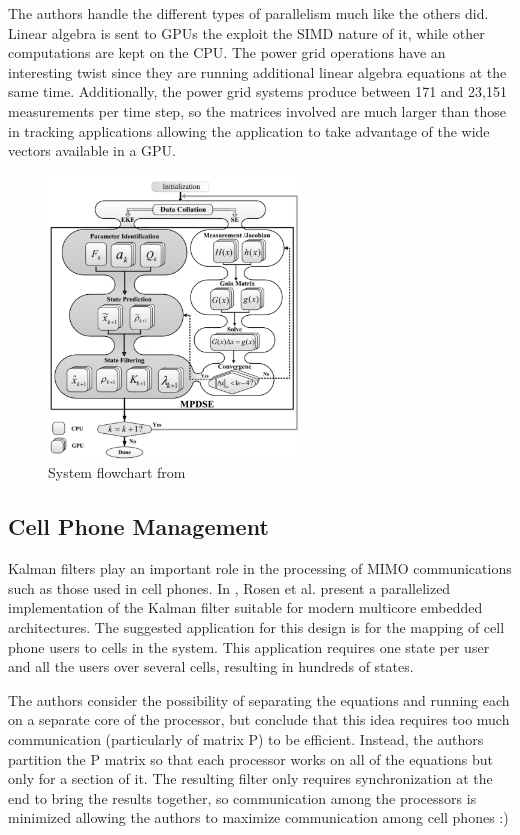 \documentclass[11pt]{article}
\begin{document}
The authors handle the different types of parallelism much like the others did. Linear algebra is sent to GPUs the exploit the SIMD nature of it, while other computations are kept on the CPU. The power grid operations have an interesting twist since they are running additional linear algebra equations at the same time. Additionally, the power grid systems produce between 171 and 23,151 measurements per time step, so the matrices involved are much larger than those in tracking applications allowing the application to take advantage of the wide vectors available in a GPU.


\begin{figure}
\centering
\includegraphics[width=0.6\textwidth]{mpdse.png}
\caption{System flowchart from \cite{karimipour2015extended}}
\label{fig:mpdse}
\end{figure}

\subsection{Cell Phone Management}
Kalman filters play an important role in the processing of MIMO communications such as those used in cell phones. In \cite{rosen2013parallelization}, Rosen et al. present a parallelized implementation of the Kalman filter suitable for modern multicore embedded architectures. The suggested application for this design is for the mapping of cell phone users to cells in the system. This application requires one state per user and all the users over several cells, resulting in hundreds of states.

The authors consider the possibility of separating the equations and running each on a separate core of the processor, but conclude that this idea requires too much communication (particularly of matrix P) to be efficient. Instead, the authors partition the P matrix so that each processor works on all of the equations but only for a section of it. The resulting filter only requires synchronization at the end to bring the results together, so communication among the processors is minimized allowing the authors to maximize communication among cell phones :)
\end{document}

